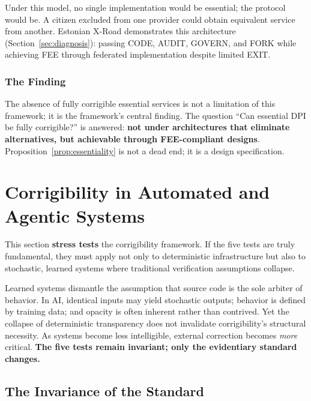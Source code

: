 \documentclass{article}
\begin{document}
Under this model, no single implementation would be essential; the protocol would be. A citizen excluded from one provider could obtain equivalent service from another. Estonian X-Road demonstrates this architecture (Section~\ref{sec:diagnosis}): passing CODE, AUDIT, GOVERN, and FORK while achieving FEE through federated implementation despite limited EXIT.

\subsubsection{The Finding}

The absence of fully corrigible essential services is not a limitation of this framework; it is the framework's central finding. The question ``Can essential DPI be fully corrigible?'' is answered: \textbf{not under architectures that eliminate alternatives, but achievable through FEE-compliant designs}. Proposition~\ref{prop:essentiality} is not a dead end; it is a design specification.


\section{Corrigibility in Automated and Agentic Systems}
\label{sec:learned}

This section \textbf{stress tests} the corrigibility framework. If the five tests are truly fundamental, they must apply not only to deterministic infrastructure but also to stochastic, learned systems where traditional verification assumptions collapse.

Learned systems dismantle the assumption that source code is the sole arbiter of behavior. In AI, identical inputs may yield stochastic outputs; behavior is defined by training data; and opacity is often inherent rather than contrived. Yet the collapse of deterministic transparency does not invalidate corrigibility's structural necessity. As systems become less intelligible, external correction becomes \textit{more} critical. \textbf{The five tests remain invariant; only the evidentiary standard changes.}

\subsection{The Invariance of the Standard}
\end{document}

